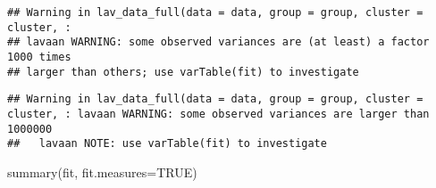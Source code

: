 \documentclass[
]{article}
\newenvironment{Shaded}{\begin{snugshade}}{\end{snugshade}}
\newcommand{\AttributeTok}[1]{\textcolor[rgb]{0.77,0.63,0.00}{#1}}
\newcommand{\ConstantTok}[1]{\textcolor[rgb]{0.00,0.00,0.00}{#1}}
\newcommand{\FunctionTok}[1]{\textcolor[rgb]{0.00,0.00,0.00}{#1}}
\newcommand{\NormalTok}[1]{#1}
\begin{document}
\begin{verbatim}
## Warning in lav_data_full(data = data, group = group, cluster = cluster, :
## lavaan WARNING: some observed variances are (at least) a factor 1000 times
## larger than others; use varTable(fit) to investigate
\end{verbatim}

\begin{verbatim}
## Warning in lav_data_full(data = data, group = group, cluster = cluster, : lavaan WARNING: some observed variances are larger than 1000000
##   lavaan NOTE: use varTable(fit) to investigate
\end{verbatim}

\begin{Shaded}
\begin{Highlighting}[]
\FunctionTok{summary}\NormalTok{(fit, }\AttributeTok{fit.measures=}\ConstantTok{TRUE}\NormalTok{)}
\end{Highlighting}
\end{Shaded}
\end{document}
